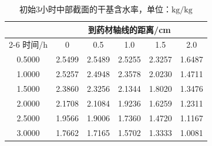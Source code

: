 \begin{table}[!htbp]\centering\small
\caption{初始3小时中部截面的干基含水率，单位：$\mathrm{kg/kg}$}\label{tab:q2-moisture}
\renewcommand{\arraystretch}{1.15}
\begin{tabular*}{0.96\textwidth}{@{\extracolsep{\fill}}cccccc}
\toprule
 & \multicolumn{5}{c}{到药材轴线的距离/cm}\\
\cmidrule(lr){2-6}
时间/h & 0 & 0.5 & 1.0 & 1.5 & 2.0\\\midrule
0.5000 & 2.5499 & 2.5489 & 2.5255 & 2.3257 & 1.6487\\
1.0000 & 2.5257 & 2.4948 & 2.3578 & 2.0230 & 1.4711\\
1.5000 & 2.3860 & 2.3256 & 2.1344 & 1.8020 & 1.3476\\
2.0000 & 2.1708 & 2.1084 & 1.9236 & 1.6259 & 1.2311\\
2.5000 & 1.9566 & 1.9006 & 1.7360 & 1.4720 & 1.1167\\
3.0000 & 1.7662 & 1.7165 & 1.5702 & 1.3333 & 1.0081\\
\bottomrule
\end{tabular*}
\end{table}
